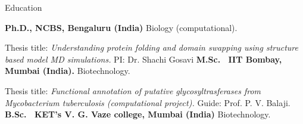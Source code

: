 \begin{rubric}{Education}

\entry*[2013 -- 2020]%
	\textbf{Ph.D., NCBS, Bengaluru (India)} Biology (computational).
	\par Thesis title: \emph{Understanding protein folding and domain swapping using structure based model MD simulations.} PI: Dr. Shachi Gosavi
%
\entry*[2011 -- 2013]%
	\textbf{M.Sc.~ IIT Bombay, Mumbai (India).} Biotechnology.\par
	Thesis title: \emph{Functional annotation of putative glycosyltrasferases from Mycobacterium tuberculosis (computational project).} Guide: Prof. P. V. Balaji.
%
\entry*[2008 -- 2011]%
	\textbf{B.Sc.~ KET's V. G. Vaze college, Mumbai (India)} Biotechnology.
\end{rubric}